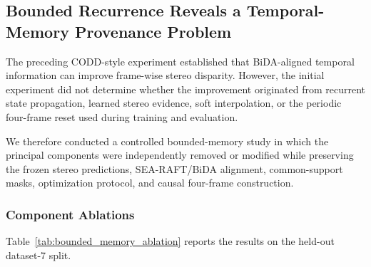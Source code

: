 \documentclass[11pt,a4paper]{article}
\begin{document}
\subsection{Bounded Recurrence Reveals a Temporal-Memory Provenance Problem}
\label{sec:bounded_memory_finding}

The preceding CODD-style experiment established that BiDA-aligned temporal information
can improve frame-wise stereo disparity. However, the initial experiment did not determine
whether the improvement originated from recurrent state propagation, learned stereo
evidence, soft interpolation, or the periodic four-frame reset used during training and
evaluation.

We therefore conducted a controlled bounded-memory study in which the principal components
were independently removed or modified while preserving the frozen stereo predictions,
SEA-RAFT/BiDA alignment, common-support masks, optimization protocol, and causal
four-frame construction.

\subsubsection{Component Ablations}

Table~\ref{tab:bounded_memory_ablation} reports the results on the held-out dataset-7
split.

\begin{table}[t]
    \centering
    \caption{Bounded-memory ablations on the held-out dataset-7 split.
    Gain is computed relative to the corresponding raw stereo prediction.
    All disparity values are expressed in cache-grid pixels.}
    \label{tab:bounded_memory_ablation}
\end{table}
\end{document}
